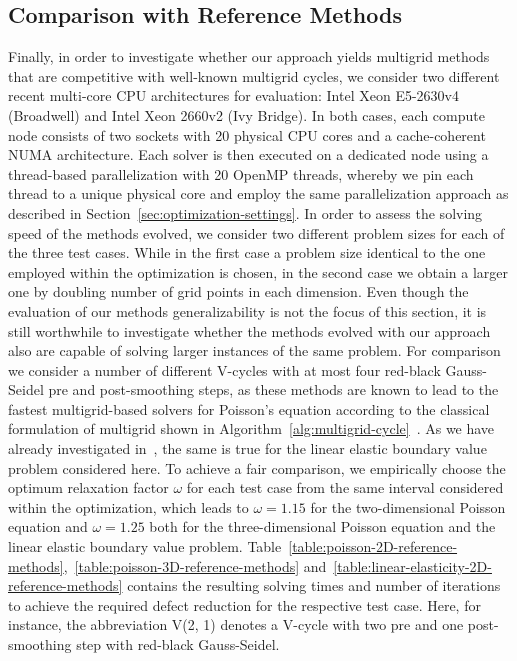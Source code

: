 \subsection{Comparison with Reference Methods}
Finally, in order to investigate whether our approach yields multigrid methods that are competitive with well-known multigrid cycles, we consider two different recent multi-core CPU architectures for evaluation: Intel Xeon E5-2630v4 (Broadwell) and Intel Xeon 2660v2 (Ivy Bridge).
In both cases, each compute node consists of two sockets with 20 physical CPU cores and a cache-coherent NUMA architecture.
Each solver is then executed on a dedicated node using a thread-based parallelization with 20 OpenMP threads, whereby we pin each thread to a unique physical core and employ the same parallelization approach as described in Section~\ref{sec:optimization-settings}.
In order to assess the solving speed of the methods evolved, we consider two different problem sizes for each of the three test cases.
While in the first case a problem size identical to the one employed within the optimization is chosen, in the second case we obtain a larger one by doubling number of grid points in each dimension.
Even though the evaluation of our methods generalizability is not the focus of this section, it is still worthwhile to investigate whether the methods evolved with our approach also are capable of solving larger instances of the same problem.
For comparison we consider a number of different V-cycles with at most four red-black Gauss-Seidel pre and post-smoothing steps, as these methods are known to lead to the fastest multigrid-based solvers for Poisson's equation according to the classical formulation of multigrid shown in Algorithm~\ref{alg:multigrid-cycle}~\cite{trottenberg2000multigrid}.
As we have already investigated in~\cite{schmitt2020constructing}, the same is true for the linear elastic boundary value problem considered here.
To achieve a fair comparison, we empirically choose the optimum relaxation factor $\omega$ for each test case from the same interval considered within the optimization, which leads to $\omega = 1.15$ for the two-dimensional Poisson equation and $\omega = 1.25$ both for the three-dimensional Poisson equation and the linear elastic boundary value problem.
Table~\ref{table:poisson-2D-reference-methods},~\ref{table:poisson-3D-reference-methods} and~\ref{table:linear-elasticity-2D-reference-methods} contains the resulting solving times and number of iterations to achieve the required defect reduction for the respective test case.
Here, for instance, the abbreviation V(2, 1) denotes a V-cycle with two pre and one post-smoothing step with red-black Gauss-Seidel.
